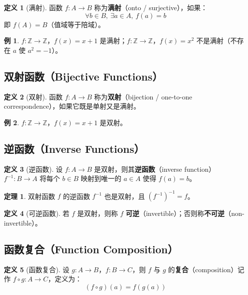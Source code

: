 \documentclass[UTF8,11pt,a4paper]{ctexbook}   %
\theoremstyle{definition}
\newtheorem{definition}{定义}[section]
\newtheorem{theorem}{定理}[section]
\newtheorem{example}{例}[section]
\begin{document}
\begin{definition}[满射]
函数 $f: A \to B$ 称为\textbf{满射}（onto / surjective），如果：
\[
\forall b \in B,\ \exists a \in A,\ f(a) = b
\]
即 $f(A) = B$（值域等于陪域）。
\end{definition}

\begin{example}
$f: \mathbb{Z} \to \mathbb{Z}$，$f(x) = x + 1$ 是满射；$f: \mathbb{Z} \to \mathbb{Z}$，$f(x) = x^2$ 不是满射（不存在 $a$ 使 $a^2 = -1$）。
\end{example}

\subsection{双射函数（Bijective Functions）}

\begin{definition}[双射]
函数 $f: A \to B$ 称为\textbf{双射}（bijection / one-to-one correspondence），如果它既是单射又是满射。
\end{definition}

\begin{example}
$f: \mathbb{Z} \to \mathbb{Z}$，$f(x) = x + 1$ 是双射。
\end{example}

\subsection{逆函数（Inverse Functions）}

\begin{definition}[逆函数]
设 $f: A \to B$ 是双射，则其\textbf{逆函数}（inverse function）$f^{-1}: B \to A$ 将每个 $b \in B$ 映射到唯一的 $a \in A$ 使得 $f(a) = b$。
\end{definition}

\begin{theorem}
双射函数 $f$ 的逆函数 $f^{-1}$ 也是双射，且 $(f^{-1})^{-1} = f$。
\end{theorem}

\begin{definition}[可逆函数]
若 $f$ 是双射，则称 $f$ \textbf{可逆}（invertible）；否则称\textbf{不可逆}（non-invertible）。
\end{definition}

\subsection{函数复合（Function Composition）}

\begin{definition}[函数复合]
设 $g: A \to B$，$f: B \to C$，则 $f$ 与 $g$ 的\textbf{复合}（composition）记作 $f \circ g: A \to C$，定义为：
\[
(f \circ g)(a) = f(g(a))
\]
\end{definition}
\end{document}
